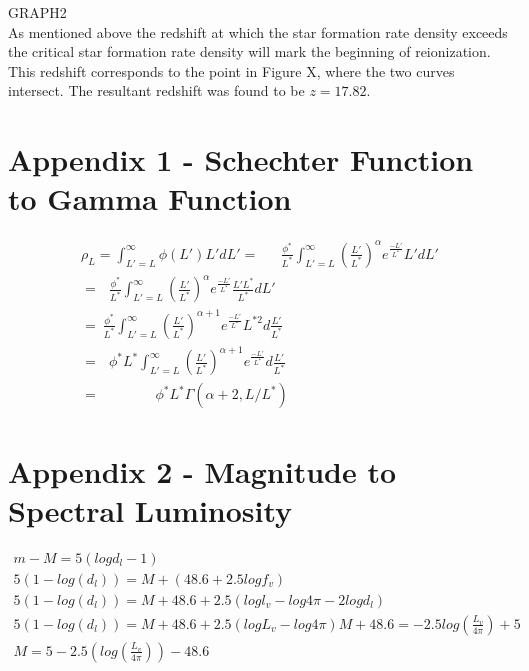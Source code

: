 \documentclass[pdf,color]{UoBnote}
\begin{document}
GRAPH2\\
\newline
As mentioned above the redshift at which the star formation rate density exceeds the critical star formation rate density will mark the beginning of reionization. This redshift corresponds to the point in Figure X, where the two curves intersect. The resultant redshift was found to be $z=17.82$.



\section{Appendix 1 - Schechter Function to Gamma Function}

\begin{eqnarray}
\rho_L = \int^{\infty}_{L'=L} \phi(L')L'dL'=\ \ \ \ \ \ \ \frac{\phi^*}{L^*}\int^{\infty}_{L'=L}\left (\frac{L'}{L^*} \right )^{\alpha}e^\frac{-L'}{L^*}L'dL'\\
= \ \ \ \frac{\phi^*}{L^*}\int^{\infty}_{L'=L}\left (\frac{L'}{L^*}\right )^{\alpha}e^\frac{-L'}{L^*}\frac{L'L^*}{L^*}dL'\\
= \ \frac {\phi^*}{L^*}\int^{\infty}_{L'=L}\left ( \frac{L'}{L^*} \right )^{\alpha+1}e^\frac{-L'}{L^*}L^{*2}d\frac{L'}{L^*} \\
= \ \ \ \phi^*L^*\int^{\infty}_{L'=L}\left ( \frac{L'}{L^*} \right )^{\alpha+1}e^\frac{-L'}{L^*}d\frac{L'}{L^*} \\
= \ \ \ \ \ \ \ \ \ \ \ \ \ \ \ \ \ \ \phi^*L^*\Gamma(\alpha+2, L/L^*)
\end{eqnarray}


\section{Appendix 2 - Magnitude to Spectral Luminosity}
\begin{eqnarray}
m-M=5(log d_l - 1)\\
5(1-log (d_l))= M + (48.6+2.5log f_v) \\
5(1-log (d_l))= M + 48.6 + 2.5(log l_v - log 4\pi - 2 log d_l) \\
5(1-log (d_l))= M+48.6 + 2.5(log L_v - log 4\pi)
M+48.6=-2.5 log (\frac{L_v}{4\pi})+5 \\
M=5-2.5(log (\frac{L_v}{4\pi})) - 48.6
\end{eqnarray}
\end{document}
